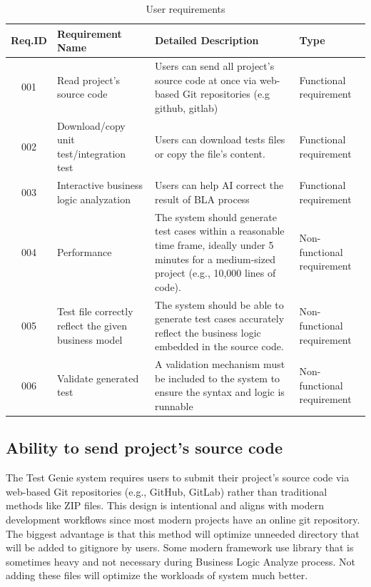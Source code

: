 \begin{table}[H]
	\centering
	\begin{tabular}{|c|p{120pt}|p{8cm}|p{70pt}|}
		\hline
		\textbf{Req.ID} & \textbf{Requirement Name} & \textbf{Detailed Description} & \textbf{Type} \\ \hline
		001 & Read project's source code & Users can send all project's source code at once via web-based Git repositories (e.g github, gitlab) & Functional requirement \\ \hline
		002 & Download/copy unit test/integration test & Users can download tests files or copy the file's content. & Functional requirement \\ \hline
		003 & Interactive business logic analyzation & Users can help AI correct the result of BLA process & Functional requirement \\ \hline
		004 & Performance & The system should generate test cases within a reasonable time frame, ideally under 5 minutes for a medium-sized project (e.g., 10,000 lines of code). & Non-functional requirement \\ \hline
		005 & Test file correctly reflect the given business model & The system should be able to generate test cases accurately reflect the business logic embedded in the source code. & Non-functional requirement \\ \hline
		006 & Validate generated test & A validation mechanism must be included to the system to ensure the syntax and logic is runnable & Non-functional requirement \\ \hline
	\end{tabular}
	\caption{User requirements}
	\label{tab:user-requirements}
\end{table}

\subsection{Ability to send project's source code}
\hspace{0.5cm}The Test Genie system requires users to submit their project's source code via web-based Git repositories (e.g., GitHub, GitLab) rather than traditional methods like ZIP files. This design is intentional and aligns with modern development workflows since most modern projects have an online git repository. The biggest advantage is that this method will optimize unneeded directory that will be added to gitignore by users. Some modern framework use library that is sometimes heavy and not necessary during Business Logic Analyze process. Not adding these files will optimize the workloads of system much better.

